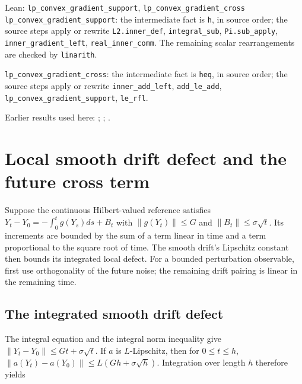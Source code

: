 \documentclass[11pt,a4paper]{report}
\begin{document}
\begin{leanbox}{Lean: \texttt{lp\_\allowbreak{}convex\_\allowbreak{}gradient\_\allowbreak{}support}, \texttt{lp\_\allowbreak{}convex\_\allowbreak{}gradient\_\allowbreak{}cross}}
\texttt{lp\_\allowbreak{}convex\_\allowbreak{}gradient\_\allowbreak{}support}: the intermediate fact is \texttt{h}, in source order; the source steps apply or rewrite \texttt{L2.\allowbreak{}inner\_\allowbreak{}def}, \texttt{integral\_\allowbreak{}sub}, \texttt{Pi.\allowbreak{}sub\_\allowbreak{}apply}, \texttt{inner\_\allowbreak{}gradient\_\allowbreak{}left}, \texttt{real\_\allowbreak{}inner\_\allowbreak{}comm}. The remaining scalar rearrangements are checked by \texttt{linarith}.



\texttt{lp\_\allowbreak{}convex\_\allowbreak{}gradient\_\allowbreak{}cross}: the intermediate fact is \texttt{heq}, in source order; the source steps apply or rewrite \texttt{inner\_\allowbreak{}add\_\allowbreak{}left}, \texttt{add\_\allowbreak{}le\_\allowbreak{}add}, \texttt{lp\_\allowbreak{}convex\_\allowbreak{}gradient\_\allowbreak{}support}, \texttt{le\_\allowbreak{}rfl}.
\end{leanbox}


Earlier results used here: \cite[Section~3.13.2]{LangevinLean2026ULASC}; \cite[Section~3.13.3]{LangevinLean2026ULASC}; \cite[Section~3.2.1]{LangevinLean2026ULASC}.
\section{\texorpdfstring{Local smooth drift defect and the future cross term}{Local smooth drift defect and the future cross term}}
\label{proof-module-ProximalLangevin-SplittingProcess-lean}


Suppose the continuous Hilbert-valued reference satisfies \(Y_t-Y_0=-\int_0^t g(Y_s)ds+B_t\) with \(\|g(Y_t)\|\le G\) and \(\|B_t\|\le\sigma\sqrt t\). Its increments are bounded by the sum of a term linear in time and a term proportional to the square root of time. The smooth drift’s Lipschitz constant then bounds its integrated local defect. For a bounded perturbation observable, first use orthogonality of the future noise; the remaining drift pairing is linear in the remaining time.

\subsection{\texorpdfstring{The integrated smooth drift defect}{The integrated smooth drift defect}}
\label{report-step-ProximalLangevin-SplittingProcess-lean-1}


The integral equation and the integral norm inequality give \(\|Y_t-Y_0\|\le Gt+\sigma\sqrt t\). If \(a\) is \(L\)-Lipschitz, then for \(0\le t\le h\), \(\|a(Y_t)-a(Y_0)\|\le L(Gh+\sigma\sqrt h)\). Integration over length \(h\) therefore yields
\end{document}
